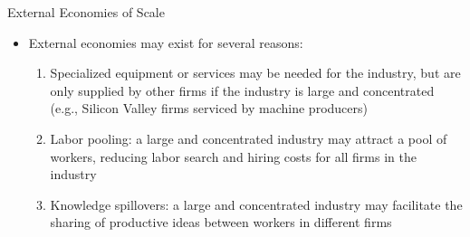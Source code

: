 \documentclass[10pt,hyperref={CJKbookmarks=true},xcolor=dvipsnames,aspectratio=169]{beamer}
\begin{document}
\begin{frame}{External Economies of Scale}

\begin{itemize}
\item External economies may exist for several reasons: 

\begin{enumerate}
\item Specialized equipment or services may be needed for the industry,
but are only supplied by other firms if the industry is large and
concentrated (e.g., Silicon Valley firms serviced by machine producers) 
\item Labor pooling: a large and concentrated industry may attract a pool
of workers, reducing labor search and hiring costs for all firms in
the industry 
\item Knowledge spillovers: a large and concentrated industry may facilitate
the sharing of productive ideas between workers in different firms 
\end{enumerate}
\end{itemize}
\end{frame}
\end{document}

